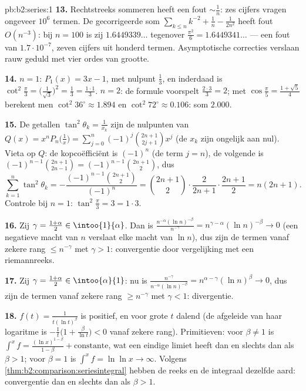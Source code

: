 \begin{solution}{pb:b2:series:1}
\textbf{13.} Rechtstreeks sommeren heeft een fout $\sim \frac1n$:
zes cijfers vragen ongeveer $10^6$ termen. De gecorrigeerde som
$\sum_{k\leq n}k^{-2} + \frac1n - \frac1{2n^2}$ heeft fout
$O(n^{-3})$: bij $n = 100$ is zij $1.6449339\dots$ tegenover
$\frac{\pi^2}6 = 1.6449341\dots$ --- een fout van
$1.7\cdot10^{-7}$, zeven cijfers uit honderd termen. Asymptotische
correcties verslaan rauw geduld met vier ordes van grootte.

\textbf{14.} $n = 1$: $P_1(x) = 3x - 1$, met nulpunt $\frac13$, en
inderdaad is $\cot^2\frac\pi3 = \bigl(\frac1{\sqrt3}\bigr)^2 =
\frac13 = \frac{1\cdot1}3$. $n = 2$: de formule voorspelt
$\frac{2\cdot3}3 = 2$; met $\cos\frac\pi5 = \frac{1 + \sqrt5}{4}$
berekent men $\cot^2 36^\circ \approx 1.894$ en $\cot^2 72^\circ
\approx 0.106$: som $2.000$.

\textbf{15.} De getallen $\tan^2\theta_k = \frac1{x_k}$ zijn de
nulpunten van $Q(x) = x^nP_n\bigl(\frac1x\bigr) =
\sum_{j=0}^n(-1)^j\binom{2n+1}{2j+1}x^j$ (de $x_k$ zijn ongelijk
aan nul). Vieta op $Q$: de kopcoëfficiënt is $(-1)^n$ (de term $j =
n$), de volgende is $(-1)^{n-1}\binom{2n+1}{2n-1} =
(-1)^{n-1}\binom{2n+1}{2}$, dus
\[
\sum_{k=1}^n\tan^2\theta_k =
-\frac{(-1)^{n-1}\binom{2n+1}2}{(-1)^n} = \binom{2n+1}2\cdot
\frac{2}{2n+1}\cdot\frac{2n+1}{2}
= n(2n+1).
\]
Controle bij $n = 1$: $\tan^2\frac\pi3 = 3 = 1\cdot3$.

\textbf{16.} Zij $\gamma = \frac{1+\alpha}2 \in
\intoo{1}{\alpha}$. Dan is $\frac{n^{-\alpha}(\ln
n)^{-\beta}}{n^{-\gamma}} = n^{\gamma - \alpha}(\ln n)^{-\beta}
\to 0$ (een negatieve macht van $n$ verslaat elke macht van $\ln
n$), dus zijn de termen vanaf zekere rang $\leq n^{-\gamma}$ met
$\gamma > 1$: convergentie door vergelijking met een
riemannreeks.

\textbf{17.} Zij $\gamma = \frac{1+\alpha}2 \in
\intoo{\alpha}{1}$: nu is $\frac{n^{-\gamma}}{n^{-\alpha}(\ln
n)^{-\beta}} = n^{\alpha-\gamma}(\ln n)^{\beta} \to 0$, dus zijn
de termen vanaf zekere rang $\geq n^{-\gamma}$ met $\gamma < 1$:
divergentie.

\textbf{18.} $f(t) = \frac1{t(\ln t)^\beta}$ is positief, 
en voor grote $t$ dalend (de afgeleide van haar logaritme is
$-\frac1t\bigl(1 + \frac{\beta}{\ln t}\bigr) < 0$ vanaf zekere
rang). Primitieven: voor $\beta \neq 1$ is $\int^x f = \frac{(\ln
x)^{1-\beta}}{1-\beta} + \text{constante}$, wat een eindige limiet
heeft dan en slechts dan als $\beta > 1$; voor $\beta = 1$ is
$\int^x f = \ln\ln x \to \infty$. Volgens
\cref{thm:b2:comparison:seriesintegral} hebben de reeks en de
integraal dezelfde aard: convergentie dan en slechts dan als $\beta
> 1$.


\end{solution}
